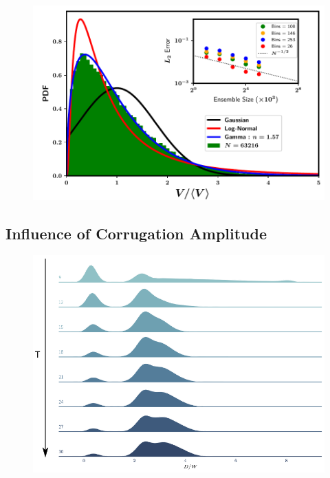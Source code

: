 

\begin{figure}
\centering
\includegraphics{plots/drop_stats/long_time_volume_fits.pdf}
	\caption{\blindtext}
\label{t2_vol_fits}
\end{figure}



\subsection*{Influence of Corrugation Amplitude}


\begin{figure}
\centering
\includegraphics{plots/drop_stats/small_amp.pdf}
	\caption{\blindtext}
\label{tseries_small}
\end{figure}

